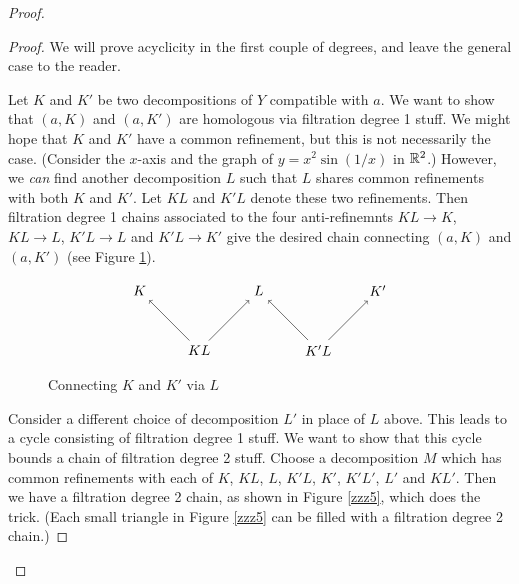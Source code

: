 \begin{proof}
\begin{proof}
We will prove acyclicity in the first couple of degrees, and 
leave the general case to the reader.

Let $K$ and $K'$ be two decompositions of $Y$ compatible with $a$.
We want to show that $(a, K)$ and $(a, K')$ are homologous via filtration degree 1 stuff.
We might hope that $K$ and $K'$ have a common refinement, but this is not necessarily
the case.
(Consider the $x$-axis and the graph of $y = x^2\sin(1/x)$ in $\mathbb{R}^2$.)
However, we {\it can} find another decomposition $L$ such that $L$ shares common
refinements with both $K$ and $K'$.
Let $KL$ and $K'L$ denote these two refinements.
Then filtration degree 1 chains associated to the four anti-refinemnts
$KL\to K$, $KL\to L$, $K'L\to L$ and $K'L\to K'$
give the desired chain connecting $(a, K)$ and $(a, K')$
(see Figure \ref{zzz4}).

\begin{figure}[!ht]
\begin{equation*}
\begin{tikzpicture}
\foreach \x/\label in {-3/K, 0/L, 3/K'} {
	\node(\label) at (\x,0) {$\label$};
}
\foreach \x/\la/\lb in {-1.5/K/L, 1.5/K'/L} {
	\node(\la \lb) at (\x,-1.5) {$\la \lb$};
	\draw[->] (\la \lb) -- (\la);
	\draw[->] (\la \lb) -- (\lb); 
}
\end{tikzpicture}
\end{equation*}
\caption{Connecting $K$ and $K'$ via $L$}
\label{zzz4}
\end{figure}

Consider a different choice of decomposition $L'$ in place of $L$ above.
This leads to a cycle consisting of filtration degree 1 stuff.
We want to show that this cycle bounds a chain of filtration degree 2 stuff.
Choose a decomposition $M$ which has common refinements with each of 
$K$, $KL$, $L$, $K'L$, $K'$, $K'L'$, $L'$ and $KL'$.
Then we have a filtration degree 2 chain, as shown in Figure \ref{zzz5}, which does the trick.
(Each small triangle in Figure \ref{zzz5} can be filled with a filtration degree 2 chain.)


\end{proof}
\end{proof}
